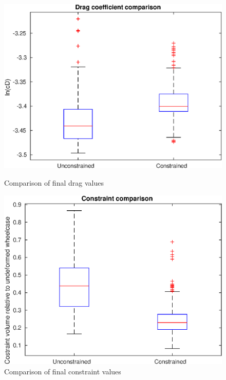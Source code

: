 \begin{figure}[h]
	\centering
	\begin{minipage}{0.45\textwidth}
		\centering
		\includegraphics[width=1\linewidth]{bilder/6pt500Samples/dragBoxplot}
		\caption{Comparison of final drag values}
		\label{fig:2nddragbox}
	\end{minipage}\hfill
	\begin{minipage}{0.45\textwidth}
		\centering
		\includegraphics[width=1\linewidth]{bilder/6pt500Samples/constraintBoxplot}
		\caption{Comparison of final constraint values}
		\label{fig:2ndconbox}
	\end{minipage}
\end{figure}

